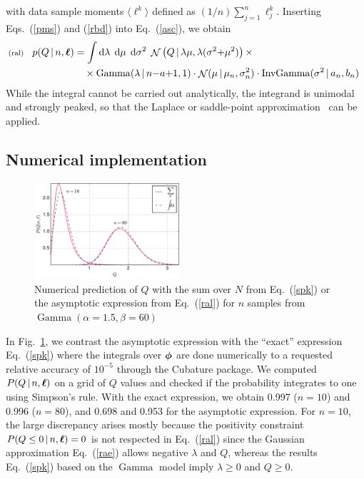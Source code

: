 \documentclass[11pt]{article}
\newcommand{\lleq}[1]{\label{#1} }
\renewcommand{\lleq}[1]{\label{#1} {\scriptstyle {\rm (#1)}} \hspace*{2ex} }
\newcommand{\cond}{\,|\,}
\newcommand{\refeq}[1]{Eq.~(\ref{#1})}
\newcommand{\reffig}[1]{Fig.~\ref{fig:#1}}
\DeclareMathOperator{\GammaDist}{Gamma}
\DeclareMathOperator{\GaussianDist}{\mathcal{N}}
\DeclareMathOperator{\InvGammaDist}{InvGamma}
\newcommand{\Lumtot}{Q}
\newcommand{\lum}{\ell}
\newcommand{\rmdx}[1]{\dd{#1}} %
\begin{document}
with data sample moments $\langle\lum^k\rangle$ defined as $(1/n)
\sum_{j=1}^n \lum_j^k$.
%
Inserting Eqs.~(\ref{pms}) and (\ref{rbd}) into \refeq{asc}, we obtain
\begin{align}
  \lleq{ral}
  p(\Lumtot \cond n,\bml)
  &= \int \rmdx{\lambda}\; \rmdx{\mu}\; \rmdx{\sigma^2}\;
  \GaussianDist \left( \Lumtot \cond \lambda \mu, \lambda (\sigma^2{+}\mu^2) \right)
  \times\\
  &\quad\times
  \GammaDist(\lambda \cond n{-}a{+}1 , 1) \cdot
  \GaussianDist(\mu\cond \mu_n,\sigma_n^2) \cdot
  \InvGammaDist(\sigma^2\cond a_n,b_n) \;
  \nonumber
\end{align}
While the integral cannot be carried out analytically, the integrand
is unimodal and strongly peaked, so that the Laplace or saddle-point
approximation~\cite[Ch. 27]{mackay2003information} can be applied.


\subsection{Numerical implementation}\label{sec:asympt-numeric}


\begin{figure}[ht]
  \centering
  \includegraphics[width=0.48\textwidth]{asymptotic}
  \caption{Numerical prediction of $\Lumtot$ with the sum over $N$
    from \refeq{spk} or the asymptotic expression from \refeq{ral} for $n$
    samples from $\GammaDist(\alpha=1.5, \beta=60)$}
\label{fig:asymptotic}
\end{figure}

In \reffig{asymptotic}, we contrast the asymptotic expression with the
``exact'' expression \refeq{spk} where the integrals over ${\bm{\phi}}$ are
done numerically to a requested relative accuracy of $10^{-5}$ through
the Cubature
package\cite{cubature,genz1980remarks,berntsen1991adaptive}. We
computed $P(\Lumtot \cond n, \bml)$ on a grid of $\Lumtot$ values and
checked if the probability integrates to one using Simpson's
rule. With the exact expression, we obtain 0.997 ($n=10$) and 0.996
($n=80$), and 0.698 and 0.953 for the asymptotic expression. For
$n=10$, the large discrepancy arises mostly because the positivity
constraint $P(Q \leq 0 \cond n, \bml) = 0$ is not respected in
\refeq{ral} since the Gaussian approximation \refeq{rae} allows
negative $\lambda$ and $\Lumtot$, whereas the results \refeq{spk}
based on the $\GammaDist$ model imply $\lambda \geq 0$ and $Q \geq 0$.
\end{document}

